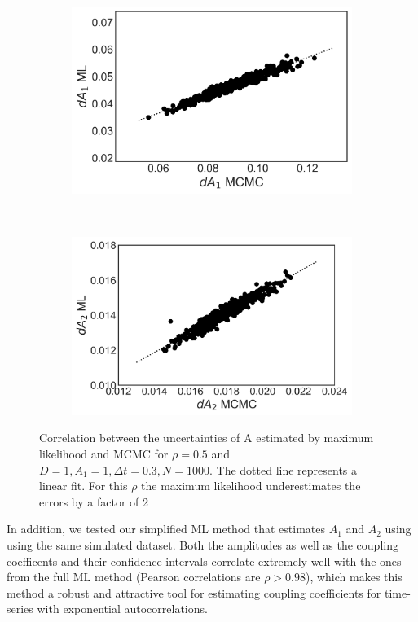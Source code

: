 \documentclass[%
 reprint,
 amsmath,amssymb,
 aps,
]{revtex4-1}
\begin{document}
\begin{figure}[H]
    \centering
    \begin{subfigure}[b]{0.4\textwidth}
        \includegraphics[width=\textwidth]{dA1corrkde05.png}
        \label{fig:A1corr}
    \end{subfigure}
    ~ %
    \begin{subfigure}[b]{0.4\textwidth}
        \includegraphics[width=\textwidth]{dA2corrkde05.png}
        \label{fig:A2corr}
    \end{subfigure}
    \caption{Correlation between the uncertainties of A estimated by maximum likelihood and MCMC for $\rho=0.5$ and $D=1,A_{1}=1,\Delta t = 0.3,N=1000$.  The dotted line represents a linear fit.  For this $\rho$ the maximum likelihood underestimates the errors by a factor of 2}\label{fig:Acorr}
\end{figure}
In addition, we tested our simplified ML method that estimates $A_1$ and $A_2$ using \cite{RN91} using the same simulated dataset.  Both the amplitudes as well as the coupling coefficents and their confidence intervals correlate extremely well with the ones from the full ML method (Pearson correlations are $\rho>0.98$), which makes this method a robust and attractive tool for estimating coupling coefficients for time-series with exponential autocorrelations.
\end{document}

